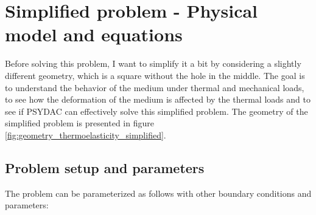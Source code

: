 \documentclass[a4paper,12pt,twoside]{report}
\begin{document}
\section{Simplified problem - Physical model and equations}

Before solving this problem, I want to simplify it a bit by considering a slightly different geometry, which is a square without the hole in the middle. The goal is to understand the behavior of the medium under thermal and mechanical loads, to see how the deformation of the medium is affected by the thermal loads and to see if PSYDAC can effectively solve this simplified problem. The geometry of the simplified problem is presented in figure \ref{fig:geometry_thermoelasticity_simplified}.

\subsection{Problem setup and parameters}
\label{subsec:problem_setup_parameters}
The problem can be parameterized as follows with other boundary conditions and parameters:
\end{document}
